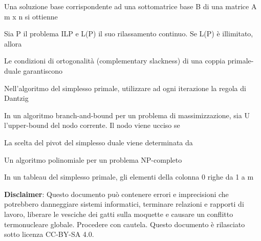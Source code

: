 \documentclass[answers, a4paper, 11pt]{exam}
\begin{document}
\begin{questions}
\begin{solution}
\end{solution}

\question Una soluzione base corrispondente ad una sottomatrice base B di una matrice A m x n si ottienne
\begin{solution}

\end{solution}

\question Sia P il problema ILP e L(P) il suo rilassamento continuo. Se L(P) è illimitato, allora
\begin{solution}

\end{solution}

\question Le condizioni di ortogonalità (complementary slackness) di una coppia primale-duale garantiscono
\begin{solution}

\end{solution}

\question Nell'algoritmo del simplesso primale, utilizzare ad ogni iterazione la regola di Dantzig
\begin{solution}

\end{solution}

\question In un algoritmo branch-and-bound per un problema di massimizzazione, sia U l'upper-bound del nodo corrente. Il nodo viene ucciso se
\begin{solution}

\end{solution}

\question La scelta del pivot del simplesso duale viene determinata da
\begin{solution}

\end{solution}

\question Un algoritmo polinomiale per un problema NP-completo
\begin{solution}

\end{solution}

\question In un tableau del simplesso primale, gli elementi della colonna 0 righe da 1 a m
\begin{solution}

\end{solution}

\end{questions}


\textbf{Disclaimer}:  Questo documento può contenere errori e imprecisioni che potrebbero danneggiare sistemi informatici, terminare relazioni e rapporti di lavoro, liberare le vesciche dei gatti sulla moquette e causare un conflitto termonucleare globale.
Procedere con cautela.
Questo documento è rilasciato sotto licenza CC-BY-SA 4.0. \ccbysa
\end{document}
